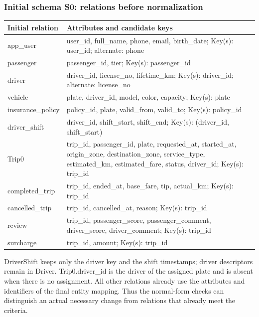 \documentclass[11pt,a4paper]{article}
\renewcommand{\arraystretch}{1.3}
\begin{document}
\subsubsection*{Initial schema S0: relations before normalization}
\begingroup\small\renewcommand{\arraystretch}{1.12}\begin{longtable}{p{3.1cm}p{12.1cm}}\toprule
Initial relation & Attributes and candidate keys\\\midrule\endhead
app\_\allowbreak{}user & user\_\allowbreak{}id, full\_\allowbreak{}name, phone, email, birth\_\allowbreak{}date; Key(s): user\_\allowbreak{}id; alternate: phone\\[4pt]
passenger & passenger\_\allowbreak{}id, tier; Key(s): passenger\_\allowbreak{}id\\[4pt]
driver & driver\_\allowbreak{}id, license\_\allowbreak{}no, lifetime\_\allowbreak{}km; Key(s): driver\_\allowbreak{}id; alternate: license\_\allowbreak{}no\\[4pt]
vehicle & plate, driver\_\allowbreak{}id, model, color, capacity; Key(s): plate\\[4pt]
insurance\_\allowbreak{}policy & policy\_\allowbreak{}id, plate, valid\_\allowbreak{}from, valid\_\allowbreak{}to; Key(s): policy\_\allowbreak{}id\\[4pt]
driver\_\allowbreak{}shift & driver\_\allowbreak{}id, shift\_\allowbreak{}start, shift\_\allowbreak{}end; Key(s): (driver\_\allowbreak{}id, shift\_\allowbreak{}start)\\[4pt]
Trip0 & trip\_\allowbreak{}id, passenger\_\allowbreak{}id, plate, requested\_\allowbreak{}at, started\_\allowbreak{}at, origin\_\allowbreak{}zone, destination\_\allowbreak{}zone, service\_\allowbreak{}type, estimated\_\allowbreak{}km, estimated\_\allowbreak{}fare, status, driver\_\allowbreak{}id; Key(s): trip\_\allowbreak{}id\\[4pt]
completed\_\allowbreak{}trip & trip\_\allowbreak{}id, ended\_\allowbreak{}at, base\_\allowbreak{}fare, tip, actual\_\allowbreak{}km; Key(s): trip\_\allowbreak{}id\\[4pt]
cancelled\_\allowbreak{}trip & trip\_\allowbreak{}id, cancelled\_\allowbreak{}at, reason; Key(s): trip\_\allowbreak{}id\\[4pt]
review & trip\_\allowbreak{}id, passenger\_\allowbreak{}score, passenger\_\allowbreak{}comment, driver\_\allowbreak{}score, driver\_\allowbreak{}comment; Key(s): trip\_\allowbreak{}id\\[4pt]
surcharge & trip\_\allowbreak{}id, amount; Key(s): trip\_\allowbreak{}id\\[4pt]\bottomrule\end{longtable}\endgroup
DriverShift keeps only the driver key and the shift timestamps; driver descriptors remain in Driver. Trip0.driver\_\allowbreak{}id is the driver of the assigned plate and is absent when there is no assignment. All other relations already use the attributes and identifiers of the final entity mapping. Thus the normal-form checks can distinguish an actual necessary change from relations that already meet the criteria.
\end{document}
